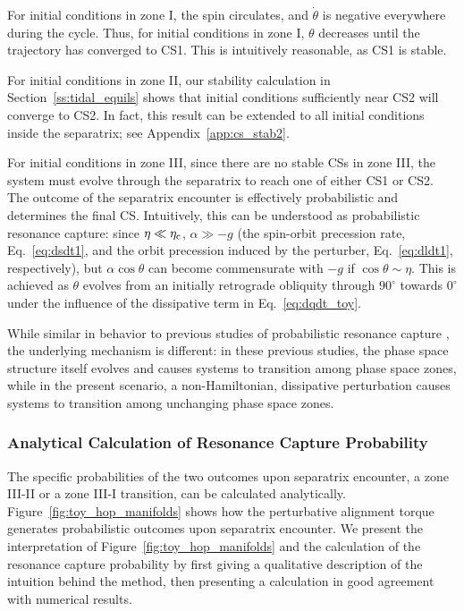 \documentclass[
        fleqn,
        usenatbib,
    ]{mnras}
\begin{document}
For initial conditions in zone I, the spin circulates, and $\dot{\theta}$ is
negative everywhere during the cycle. Thus, for initial conditions in zone I,
$\theta$ decreases until the trajectory has converged to CS1. This is
intuitively reasonable, as CS1 is stable.

For initial conditions in zone II, our stability calculation in
Section~\ref{ss:tidal_equils} shows that initial conditions sufficiently near CS2
will converge to CS2. In fact, this result can be extended to all initial
conditions inside the separatrix; see Appendix~\ref{app:cs_stab2}.

For initial conditions in zone III, since there are no stable CSs in zone III,
the system must evolve through the separatrix to reach one of either CS1 or CS2.
The outcome of the separatrix encounter is effectively probabilistic and
determines the final CS\@. Intuitively, this can be understood as probabilistic
resonance capture: since $\eta \ll \eta_{\rm c}$, $\alpha \gg -g$ (the
spin-orbit precession rate, Eq.~\ref{eq:dsdt1}, and the orbit precession induced
by the perturber, Eq.~\ref{eq:dldt1}, respectively), but $\alpha \cos \theta$
can become commensurate with $-g$ if $\cos \theta \sim \eta$. This is achieved
as $\theta$ evolves from an initially retrograde obliquity through $90^\circ$
towards $0^\circ$ under the influence of the dissipative term in
Eq.~\eqref{eq:dqdt_toy}.

While similar in behavior to previous studies of probabilistic resonance capture
\citep{henrard1982, su2020}, the underlying mechanism is different: in these
previous studies, the phase space structure itself evolves and causes systems to
transition among phase space zones, while in the present scenario, a
non-Hamiltonian, dissipative perturbation causes systems to transition among
unchanging phase space zones.

\subsubsection{Analytical Calculation of Resonance Capture Probability}

The specific probabilities of the two outcomes upon separatrix encounter, a zone
III-II or a zone III-I transition, can be calculated analytically.
Figure~\ref{fig:toy_hop_manifolds} shows how the perturbative alignment torque
generates probabilistic outcomes upon separatrix encounter. We present the
interpretation of Figure~\ref{fig:toy_hop_manifolds} and the calculation of the
resonance capture probability by first giving a qualitative description of the
intuition behind the method, then presenting a calculation in good agreement with
numerical results.
\end{document}
